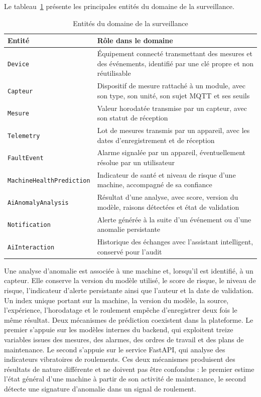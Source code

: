 Le tableau~\ref{tab:modele-monitoring} présente les principales entités du domaine de la surveillance.

\begin{table}[H]
\centering
\caption{Entités du domaine de la surveillance}
\label{tab:modele-monitoring}
\footnotesize
\setlength{\tabcolsep}{4pt}
\begin{tabularx}{\textwidth}{|>{\raggedright\arraybackslash}p{4.1cm}|>{\raggedright\arraybackslash}X|}
\hline
\textbf{Entité} & \textbf{Rôle dans le domaine} \\
\hline
\texttt{Device} & Équipement connecté transmettant des mesures et des événements, identifié par une clé propre et non réutilisable \\
\hline
\texttt{Capteur} & Dispositif de mesure rattaché à un module, avec son type, son unité, son sujet MQTT et ses seuils \\
\hline
\texttt{Mesure} & Valeur horodatée transmise par un capteur, avec son statut de réception \\
\hline
\texttt{Telemetry} & Lot de mesures transmis par un appareil, avec les dates d'enregistrement et de réception \\
\hline
\texttt{FaultEvent} & Alarme signalée par un appareil, éventuellement résolue par un utilisateur \\
\hline
\texttt{MachineHealthPrediction} & Indicateur de santé et niveau de risque d'une machine, accompagné de sa confiance \\
\hline
\texttt{AiAnomalyAnalysis} & Résultat d'une analyse, avec score, version du modèle, raisons détectées et état de validation \\
\hline
\texttt{Notification} & Alerte générée à la suite d'un événement ou d'une anomalie persistante \\
\hline
\texttt{AiInteraction} & Historique des échanges avec l'assistant intelligent, conservé pour l'audit \\
\hline
\end{tabularx}
\end{table}

Une analyse d'anomalie est associée à une machine et, lorsqu'il est identifié, à un capteur. Elle conserve la version du modèle utilisé, le score de risque, le niveau de risque, l'indicateur d'alerte persistante ainsi que l'auteur et la date de validation. Un index unique portant sur la machine, la version du modèle, la source, l'expérience, l'horodatage et le roulement empêche d'enregistrer deux fois le même résultat.
Deux mécanismes de prédiction coexistent dans la plateforme. Le premier s'appuie sur les modèles internes du backend, qui exploitent treize variables issues des mesures, des alarmes, des ordres de travail et des plans de maintenance. Le second s'appuie sur le service FastAPI, qui analyse des indicateurs vibratoires de roulements. Ces deux mécanismes produisent des résultats de nature différente et ne doivent pas être confondus : le premier estime l'état général d'une machine à partir de son activité de maintenance, le second détecte une signature d'anomalie dans un signal de roulement.

